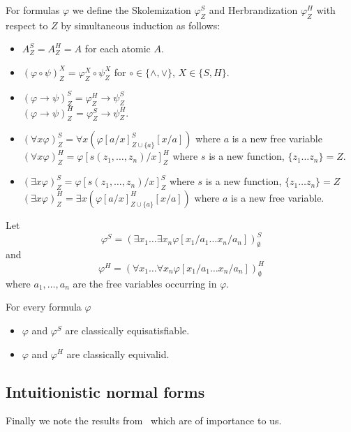 \documentclass[runningheads]{llncs}
\begin{document}
\begin{definition}
	For formulas $\varphi$ we define the Skolemization $\varphi^S_Z$ and Herbrandization $\varphi^H_Z$ with respect to $Z$ by simultaneous induction as follows:
	\begin{itemize}
		\item $A^S_Z = A^H_Z = A$ for each atomic $A$.
		\item $(\varphi\circ\psi)^X_Z = \varphi^X_Z\circ\psi^X_Z$ for $\circ\in\{\wedge, \vee\}$, $X\in\{S, H\}$.
		\item $(\varphi\to\psi)^S_Z = \varphi^H_Z\to \psi^S_Z$\\$(\varphi\to\psi)^H_Z = \varphi^S_Z\to\psi^H_Z$.
		\item $(\forall x\varphi)^S_Z = \forall x(\varphi[a/x]^S_{Z\cup\{a\}}[x/a])$ where $a$ is a new free variable\\$(\forall x\varphi)^H_Z = \varphi[s(z_1,\dots,z_n)/x]^H_Z$ where $s$ is a new function, $\{z_1\dots z_n\} = Z$.
		\item $(\exists x\varphi)^S_Z = \varphi[s(z_1,\dots,z_n)/x]^S_Z$ where $s$ is a new function, $\{z_1\dots z_n\} = Z$\\$(\exists x\varphi)^H_Z = \exists x(\varphi[a/x]^H_{Z\cup\{a\}}[x/a])$ where $a$ is a new free variable.
	\end{itemize}
	Let $$\varphi^S = (\exists x_1\dots\exists x_n \varphi[x_1/a_1\dots x_n/a_n])^S_\emptyset$$ and $$\varphi^H = (\forall x_1\dots\forall x_n \varphi[x_1/a_1\dots x_n/a_n])^H_\emptyset$$ where $a_1,\dots,a_n$ are the free variables occurring in $\varphi$.
\end{definition}

\begin{theorem}
	\label{thm:herbrand-skolem}
	For every formula $\varphi$
	\begin{itemize}
		\item $\varphi$ and $\varphi^S$ are classically equisatisfiable.
		\item $\varphi$ and $\varphi^H$ are classically equivalid.
	\end{itemize}
\end{theorem}


\subsection{Intuitionistic normal forms}

Finally we note the results from~\cite{otten2005clausal} which are of importance to us.
\end{document}
